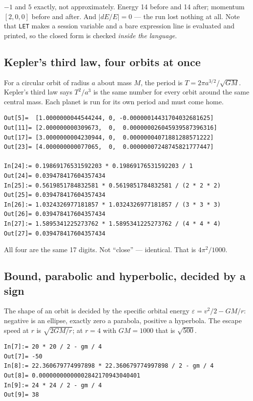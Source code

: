\documentclass[11pt]{article}
\newcommand{\kw}[1]{\texttt{\uppercase{#1}}}
\begin{document}
$-1$ and $5$ exactly, not approximately. Energy 14 before and 14 after;
momentum $[2,0,0]$ before and after. And $|dE/E| = 0$ --- the run lost
nothing at all. Note that \kw{let} makes a session variable and a bare
expression line is evaluated and printed, so the closed form is checked
\emph{inside the language}.

\subsection{Kepler's third law, four orbits at once}

For a circular orbit of radius $a$ about mass $M$, the period is
$T = 2\pi a^{3/2}/\sqrt{GM}$. Kepler's third law says $T^2/a^3$ is the
same number for every orbit around the same central mass. Each planet
is run for its own period and must come home.

\begin{lstlisting}
Out[5]=  [1.0000000044544244, 0, -0.00000014431704032681625]
Out[11]= [2.000000000309673,  0,  0.000000026045939587396316]
Out[17]= [3.0000000004230944, 0,  0.00000004071881288571222]
Out[23]= [4.000000000077065,  0,  0.00000007248745821777447]

In[24]:= 0.19869176531592203 * 0.19869176531592203 / 1
Out[24]= 0.039478417604357434
In[25]:= 0.5619851784832581 * 0.5619851784832581 / (2 * 2 * 2)
Out[25]= 0.039478417604357434
In[26]:= 1.0324326977181857 * 1.0324326977181857 / (3 * 3 * 3)
Out[26]= 0.039478417604357434
In[27]:= 1.5895341225273762 * 1.5895341225273762 / (4 * 4 * 4)
Out[27]= 0.039478417604357434
\end{lstlisting}

All four are the same 17 digits. Not ``close'' --- identical. That is
$4\pi^2/1000$.

\subsection{Bound, parabolic and hyperbolic, decided by a sign}

The shape of an orbit is decided by the specific orbital energy
$\varepsilon = v^2/2 - GM/r$: negative is an ellipse, exactly zero a
parabola, positive a hyperbola. The escape speed at $r$ is
$\sqrt{2GM/r}$; at $r=4$ with $GM=1000$ that is $\sqrt{500}$.

\begin{lstlisting}
In[7]:= 20 * 20 / 2 - gm / 4
Out[7]= -50
In[8]:= 22.360679774997898 * 22.360679774997898 / 2 - gm / 4
Out[8]= 0.00000000000002842170943040401
In[9]:= 24 * 24 / 2 - gm / 4
Out[9]= 38
\end{lstlisting}
\end{document}
